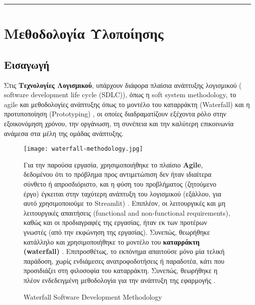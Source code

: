 \documentclass{article}  %
\begin{document}
\noindent\rule{\linewidth}{0.4pt}




\section{Μεθοδολογία Υλοποίησης}
\subsection{Εισαγωγή}
Στις \textbf{Τεχνολογίες Λογισμικού}, υπάρχουν διάφορα πλαίσια ανάπτυξης λογισμικού ( {software development life cycle (SDLC)}), όπως η  {soft system methodology}, το  {agile} και μεθοδολογίες ανάπτυξης όπως το μοντέλο του καταρράκτη ({Waterfall}) και η προτυποποίηση ({Prototyping}) \cite{edwards2025}, οι οποίες διαδραματίζουν εξέχοντα ρόλο στην εξοικονόμηση χρόνου, την οργάνωση, τη συνέπεια και την καλύτερη επικοινωνία ανάμεσα στα μέλη της ομάδας ανάπτυξης.


\vspace{-1em}
\begin{figure}[ht!]
\centering
\begin{minipage}{0.5\textwidth}
    \texttt{[image: waterfall-methodology.jpg]}
    \caption{Waterfall Software Development Methodology}
    \label{fig:waterfall}
\end{minipage}
\hfill
\begin{minipage}{0.45\textwidth}
    Για την παρούσα εργασία, χρησιμοποιήθηκε το πλαίσιο \textbf{Agile}, δεδομένου ότι το πρόβλημα προς αντιμετώπιση δεν ήταν ιδιαίτερα σύνθετο ή απροσδιόριστο, και η φύση του προβλήματος (ζητούμενο έργο) έγκειται στην ταχύτερη ανάπτυξη του λογισμικού (εξάλλου, για αυτό χρησιμοποιούμε το Streamlit) \cite{flora2014systematic}. Επιπλέον, οι λειτουργικές και μη λειτουργικές απαιτήσεις (functional and non-functional requirements), καθώς και οι προδιαγραφές της εργασίας, ήταν εκ των προτέρων γνωστές (από την εκφώνηση της εργασίας). Συνεπώς, θεωρήθηκε κατάλληλο και χρησιμοποιήθηκε το μοντέλο του \textbf{καταρράκτη (waterfall)} \cite{senarath2021waterfall}. Επιπροσθέτως, το εκπόνημα απαιτούσε μόνο μία τελική παράδοση, χωρίς ενδιάμεσες ανατροφοδοτήσεις ή παραδοτέα, κάτι που προσιδιάζει στη φιλοσοφία του καταρράκτη. Συνεπώς, θεωρήθηκε η πλέον ενδεδειγμένη μεθοδολογία για την ανάπτυξη της εφαρμογής \cite{saeed2019analysis}.
\end{minipage}
\end{figure}
\end{document}
